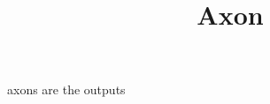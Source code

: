 \documentclass[a4paper]{article}
\title{Axon}
\date{}
\begin{document}
    \maketitle
    axons are the outputs
\end{document}
